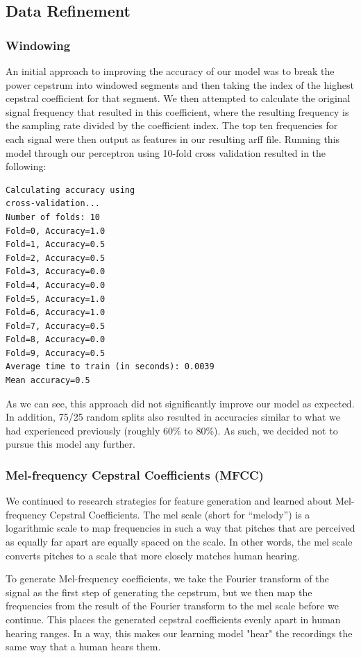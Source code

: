 \documentclass{article}
\begin{document}
\subsection{Data Refinement}

\subsubsection{Windowing}

An initial approach to improving the accuracy of our model was to break the power cepstrum into windowed segments and then taking the index of the highest cepstral coefficient for that segment.  We then attempted to calculate the original signal frequency that resulted in this coefficient, where the resulting frequency is the sampling rate divided by the coefficient index.  The top ten frequencies for each signal were then output as features in our resulting arff file.  Running this model through our perceptron using 10-fold cross validation resulted in the following:

\begin{verbatim}
Calculating accuracy using
cross-validation...
Number of folds: 10
Fold=0, Accuracy=1.0
Fold=1, Accuracy=0.5
Fold=2, Accuracy=0.5
Fold=3, Accuracy=0.0
Fold=4, Accuracy=0.0
Fold=5, Accuracy=1.0
Fold=6, Accuracy=1.0
Fold=7, Accuracy=0.5
Fold=8, Accuracy=0.0
Fold=9, Accuracy=0.5
Average time to train (in seconds): 0.0039
Mean accuracy=0.5
\end{verbatim}

As we can see, this approach did not significantly improve our model as expected.  In addition, 75/25 random splits also resulted in accuracies similar to what we had experienced previously (roughly 60\% to 80\%).  As such, we decided not to pursue this model any further.

\subsubsection{Mel-frequency Cepstral Coefficients (MFCC)}

We continued to research strategies for feature generation and learned about Mel-frequency Cepstral Coefficients. The mel scale (short for “melody”) is a logarithmic scale to map frequencies in such a way that pitches that are perceived as equally far apart are equally spaced on the scale. In other words, the mel scale converts pitches to a scale that more closely matches human hearing.

To generate Mel-frequency coefficients, we take the Fourier transform of the signal as the first step of generating the cepstrum, but we then map the frequencies from the result of the Fourier transform to the mel scale before we continue. This places the generated cepstral coefficients evenly apart in human hearing ranges. In a way, this makes our learning model "hear" the recordings the same way that a human hears them.
\end{document}

